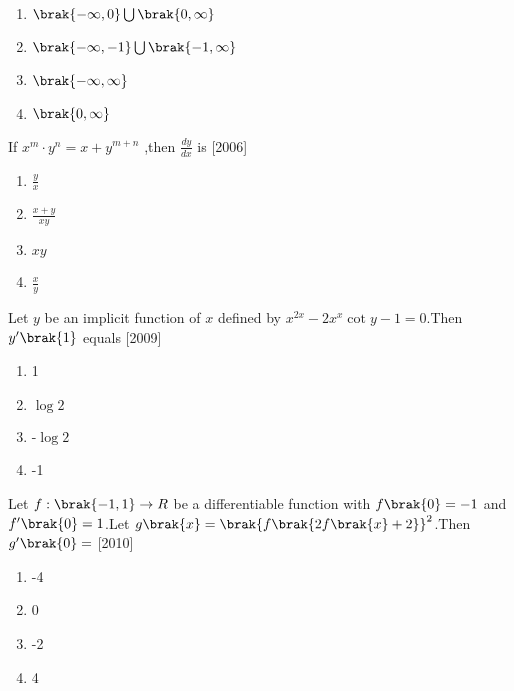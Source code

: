     \begin{multicols}{2}
    
    \begin{enumerate}
    \item $\brak{-\infty,0}\bigcup\brak{0,\infty}$
    \item $\brak{-\infty,-1}\bigcup\brak{-1,\infty}$
    \item $\brak{-\infty,\infty}$
    \item $\brak{0,\infty}$
    \end{enumerate}
    \end{multicols}
    \item If $x^m\cdot y^n={x+y}^{m+n}$ ,then $\frac{dy}{dx}$ is \hfill[2006]
    \begin{multicols}{4}
        
  
    \begin{enumerate}
    \item $\frac{y}{x}$
    \item $\frac{x+y}{xy}$
    \item $xy$
    \item $\frac{x}{y}$
    \end{enumerate}
    \end{multicols}
    \item Let $y$ be an implicit function of $x$ defined by $x^{2x}-2x^x\cot{y}-1=0$.Then $y^{\prime}\brak{1}$ equals
    \hfill[2009]
    \begin{multicols}{4}
    \begin{enumerate}
    \item 1
    \item $\log2$
    \item -$\log2$
    \item -1
    \end{enumerate}
    \end{multicols}
    \item Let $f:\brak{-1,1}\rightarrow R$ be a differentiable function with $f\brak{0}=-1$ and $f^{\prime}\brak{0}=1$.Let $g\brak{x}=\brak{f\brak{2f\brak{x}+2}}^2$.Then $g^{\prime}\brak{0}=$
	    \hfill[2010]
     \begin{multicols}{4}
         
     
	    \begin{enumerate}
	\item -4
	\item 0
	\item -2
	\item 4
	    \end{enumerate}
     \end{multicols}
